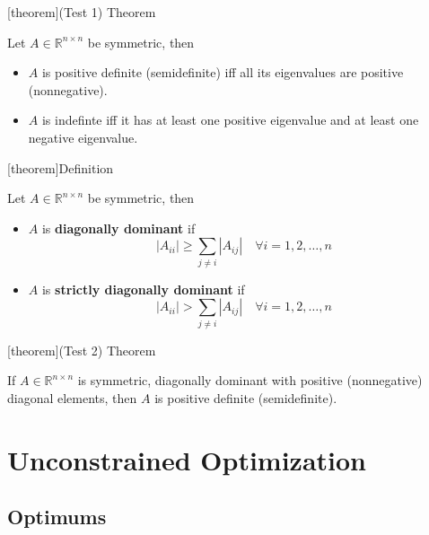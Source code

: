 \documentclass[12pt]{report}
\theoremstyle{definition}
\begin{document}
[theorem]{(Test 1) Theorem}
\begin{eigenvalue characterization}
    Let $A\in\mathbb{R}^{n\times n}$ be symmetric, then
    \begin{itemize}
        \item $A$ is positive definite (semidefinite) iff all its eigenvalues
            are positive (nonnegative).
        \item $A$ is indefinte iff it has at least one positive eigenvalue and
            at least one negative eigenvalue.
    \end{itemize} 
\end{eigenvalue characterization}

[theorem]{Definition}
\begin{diagonal dominance}
    Let $A\in\mathbb{R}^{n\times n}$ be symmetric, then
    \begin{itemize}
        \item $A$ is \textbf{diagonally dominant} if
            \[
                |A_{ii}| \ge \sum_{j\neq i}|A_{ij}|\quad\forall i=1,2,\ldots,n
            \]
        \item $A$ is \textbf{strictly diagonally dominant} if
            \[
                |A_{ii}|>\sum_{j\neq i}|A_{ij}|\quad\forall i=1,2,\ldots,n
            \]
    \end{itemize} 
\end{diagonal dominance}

[theorem]{(Test 2) Theorem}
\begin{positive definiteness of diagonally dominant matrices}
    If $A\in\mathbb{R}^{n\times n}$ is symmetric, diagonally dominant with
    positive (nonnegative) diagonal elements, then $A$ is positive definite
    (semidefinite).
\end{positive definiteness of diagonally dominant matrices}





\chapter{Unconstrained Optimization}

\section{Optimums}
\end{document}
